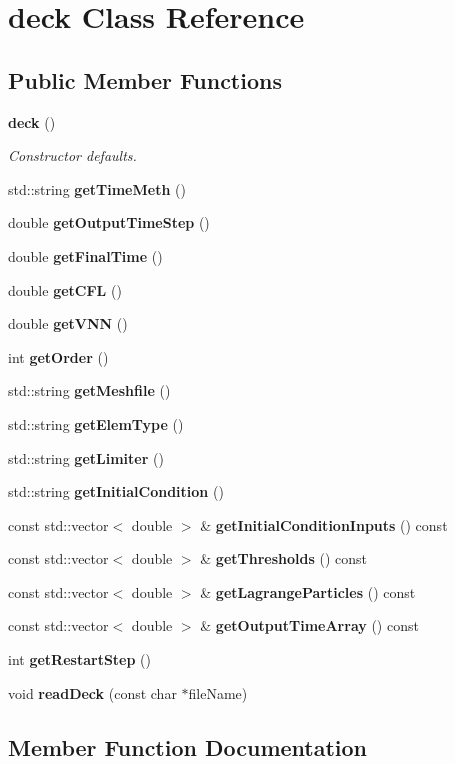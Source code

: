 \section{deck Class Reference}
\label{classdeck}
\subsection*{Public Member Functions}
\begin{DoxyCompactItemize}
\item 
{\bf deck} ()\label{classdeck_a2ff8465ba7b13201bdf650fe461b442e}

\begin{DoxyCompactList}\small\item\em Constructor defaults. \end{DoxyCompactList}\item 
std\-::string {\bf get\-Time\-Meth} ()
\item 
double {\bf get\-Output\-Time\-Step} ()
\item 
double {\bf get\-Final\-Time} ()
\item 
double {\bf get\-C\-F\-L} ()
\item 
double {\bf get\-V\-N\-N} ()
\item 
int {\bf get\-Order} ()
\item 
std\-::string {\bf get\-Meshfile} ()
\item 
std\-::string {\bf get\-Elem\-Type} ()
\item 
std\-::string {\bf get\-Limiter} ()
\item 
std\-::string {\bf get\-Initial\-Condition} ()
\item 
const std\-::vector$<$ double $>$ \& {\bf get\-Initial\-Condition\-Inputs} () const 
\item 
const std\-::vector$<$ double $>$ \& {\bf get\-Thresholds} () const 
\item 
const std\-::vector$<$ double $>$ \& {\bf get\-Lagrange\-Particles} () const 
\item 
const std\-::vector$<$ double $>$ \& {\bf get\-Output\-Time\-Array} () const 
\item 
int {\bf get\-Restart\-Step} ()
\item 
void {\bf read\-Deck} (const char $\ast$file\-Name)
\end{DoxyCompactItemize}


\subsection{Member Function Documentation}
